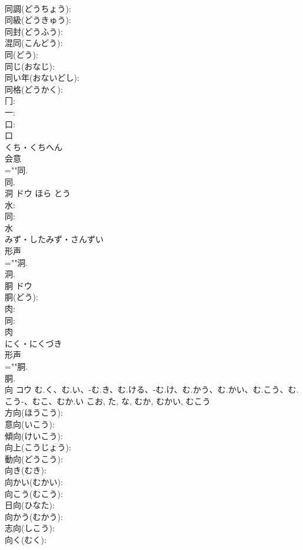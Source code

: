\documentclass[8pt]{extreport}
\begin{document}
\begin{CJK}{UTF8}{min}
\\	同調(どうちょう): 
\\	同級(どうきゅう): 
\\	同封(どうふう): 
\\	混同(こんどう): 
\\	同(どう): 
\\	同じ(おなじ): 
\\	同い年(おないどし): 
\\	同格(どうかく): 
\\	冂: 
\\	一: 
\\	口: 
\\	口	
\\	くち・くちへん	
\\	会意 
\\	=""同.
\\	同.
\\	洞	ドウ	ほら	とう	
\\	水: 
\\	同: 
\\	水	
\\	みず・したみず・さんずい	
\\	形声 
\\	=""洞.
\\	洞.
\\	胴	ドウ			
\\	胴(どう): 
\\	肉: 
\\	同: 
\\	肉	
\\	にく・にくづき	
\\	形声 
\\	=""胴.
\\	胴.
\\	向	コウ	む.く、む.い、-む.き、む.ける、-む.け、む.かう、む.かい、む.こう、む.こう-、むこ、むか.い	こお, た, な, むか, むかい, むこう	
\\	方向(ほうこう): 
\\	意向(いこう): 
\\	傾向(けいこう): 
\\	向上(こうじょう): 
\\	動向(どうこう): 
\\	向き(むき): 
\\	向かい(むかい): 
\\	向こう(むこう): 
\\	日向(ひなた): 
\\	向かう(むかう): 
\\	志向(しこう): 
\\	向く(むく): 

\end{CJK}
\end{document}
